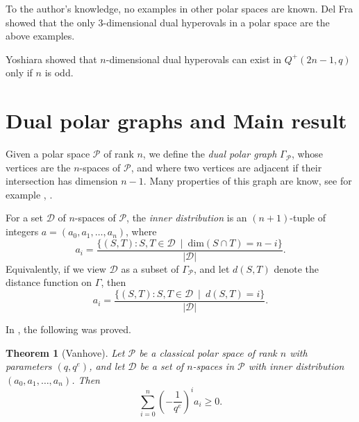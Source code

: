\documentclass{amsart}
\theoremstyle{plain}
\newtheorem{theorem}{Theorem}
\theoremstyle{definition}
\begin{document}
To the author's knowledge, no examples in other polar spaces are known. Del Fra \cite{DelFra2000} showed that the only $3$-dimensional dual hyperovals in a polar space are the above examples. 

Yoshiara \cite{Yoshiara2005} showed that $n$-dimensional dual hyperovals can exist in $Q^{+}(2n-1,q)$ only if $n$ is odd.

\section{Dual polar graphs and Main result}

Given a polar space ${\mathcal{P}}$ of rank $n$, we define the \emph{dual polar graph} $\Gamma_{\mathcal{P}}$, whose vertices are the $n$-spaces of ${\mathcal{P}}$, and where two vertices are adjacent if their intersection has dimension $n-1$. Many properties of this graph are know, see for example \cite{BrCoNe}, \cite{VanhoveThesis}. 

For a set ${\mathcal D}$ of $n$-spaces of ${\mathcal{P}}$, the \emph{inner distribution} is an $(n+1)$-tuple of integers $a = (a_0,a_1,\ldots,a_n)$, where
\[
a_i = \frac{\{(S,T):S,T \in {\mathcal D}~\mid~{\mathrm{dim}}(S \cap T) = n-i\}}{|{\mathcal D}|}.
\]
Equivalently, if we view ${\mathcal D}$ as a subset of $\Gamma_{\mathcal{P}}$, and let $d(S,T)$ denote the distance function on $\Gamma$, then
\[
a_i = \frac{\{(S,T):S,T \in {\mathcal D}~\mid~d(S,T) = i\}}{|{\mathcal D}|}.
\]

In \cite[Lemma 3.2]{Van10}, the following was proved.
\begin{theorem}[Vanhove]
Let ${\mathcal{P}}$ be a classical polar space of rank $n$ with parameters $(q,q^e)$, and let ${\mathcal D}$ be a set of $n$-spaces in ${\mathcal{P}}$ with inner distribution $(a_0,a_1,\ldots,a_n)$. Then
\[
\sum_{i=0}^n \left(-\frac{1}{q^e}\right)^i a_i \geq 0.
\]
\end{theorem}
\end{document}
